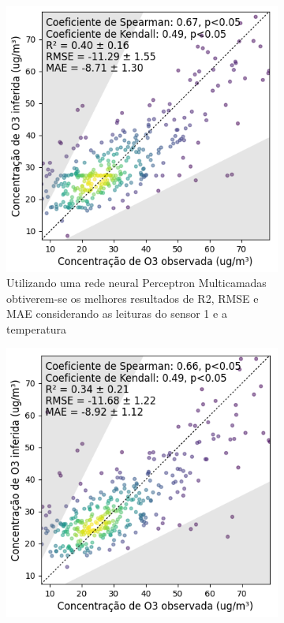 \begin{figure}[h!]
    \centering
    \caption{Gráfico de dispersão das leituras dos sensores de \acrshort{o3} OX-B431 e a estação de referência após aplicar modelos de regressão considerando a temperatura}
    \begin{subfigure}{0.49\textwidth}
        \includegraphics[width=\textwidth]{chapters/4-CALIBRAÇÃO MÚLTIPLOS SENSORES/Figuras/o3-b4-1-T-MLP-Regression.png}
        \caption{Utilizando uma rede neural Perceptron Multicamadas obtiverem-se os melhores resultados de R2, RMSE e MAE considerando as leituras do sensor 1 e a temperatura}
        \label{fig:data-o3-1-T-reference-corr-MLP}
    \end{subfigure}
    \hfill
    \begin{subfigure}{0.49\textwidth}
        \includegraphics[width=\textwidth]{chapters/4-CALIBRAÇÃO MÚLTIPLOS SENSORES/Figuras/o3-b4-1-T-KNN-Regression.png}

\end{subfigure}
\end{figure}
